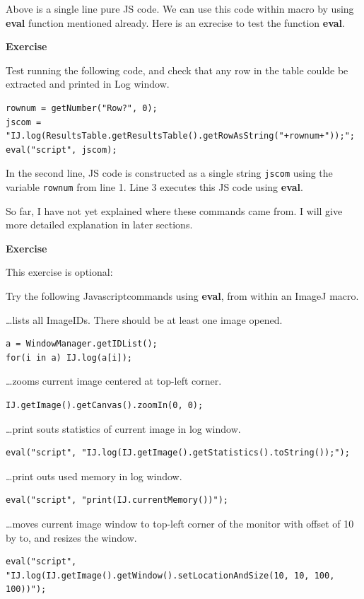 \documentclass[11pt,a4paper,oneside]{report}
\newenvironment{indentexercise}[1]%
{{\setlength{\leftmargin}{2em}}%
\textbf{Exercise \thesubsection-#1}%
\begin{list}{}%
	\item%
}
{\end{list}}
\newcommand{\ilcom}[1]{\texttt{\small#1}}
\begin{document}
Above is a single line pure JS code. We can use this code within macro by using \textbf{eval} function mentioned already. Here is an exrecise to test the function \textbf{eval}. 

\begin{indentexercise}{2}
Test running the following code, and check that any row in the table coulde be extracted and printed in Log window. 
\begin{lstlisting}
rownum = getNumber("Row?", 0);
jscom = "IJ.log(ResultsTable.getResultsTable().getRowAsString("+rownum+"));";
eval("script", jscom);
\end{lstlisting}
\end{indentexercise}

In the second line, JS code is constructed as a single string \ilcom{jscom} using the variable \ilcom{rownum} from line 1. Line 3 executes this JS code using \textbf{eval}. 

So far, I have not yet explained where these commands came from. I will give more detailed explanation in later sections.  

\begin{indentexercise}{2}
This exercise is optional:

Try the following Javascriptcommands using \textbf{eval}, from within an ImageJ macro. 

\dots lists all ImageIDs. There should be at least one image opened. 
\begin{lstlisting}[numbers=none]
a = WindowManager.getIDList();
for(i in a) IJ.log(a[i]);
\end{lstlisting}

\dots zooms current image centered at top-left corner.
\begin{lstlisting}[numbers=none]
IJ.getImage().getCanvas().zoomIn(0, 0);
\end{lstlisting}

\dots print souts statistics of current image in log window.
\begin{lstlisting}[numbers=none]
eval("script", "IJ.log(IJ.getImage().getStatistics().toString());");
\end{lstlisting}

\dots print outs used memory in log window.
\begin{lstlisting}[numbers=none]
eval("script", "print(IJ.currentMemory())");
\end{lstlisting}

\dots moves current image window to top-left corner of the monitor with offset of 10 by to, and resizes the window. 
\begin{lstlisting}[numbers=none]
eval("script", "IJ.log(IJ.getImage().getWindow().setLocationAndSize(10, 10, 100, 100))");
\end{lstlisting}
\end{indentexercise}
\end{document}
